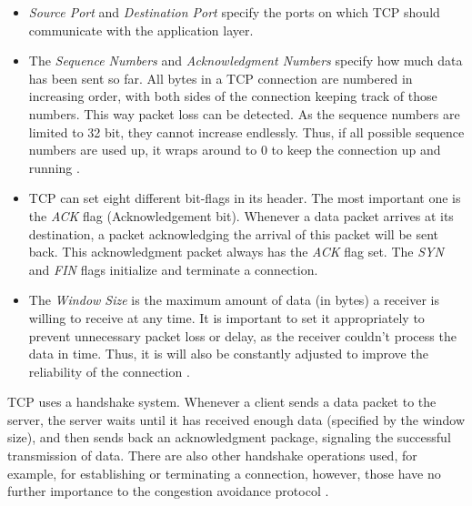 \documentclass[a4paper,conference]{IEEEtran}
\begin{document}
\begin{itemize}
\item \textit{Source Port} and \textit{Destination Port} specify the ports on which TCP should communicate with the application layer.

\item The \textit{Sequence Numbers} and \textit{Acknowledgment Numbers} specify how much data has been sent so far. All bytes in a TCP connection are numbered in increasing order, with both sides of the connection keeping track of those numbers. This way packet loss can be detected. As the sequence numbers are limited to 32 bit, they cannot increase endlessly. Thus, if all possible sequence numbers are used up, it wraps around to 0 to keep the connection up and running \cite{postel1981transmission}.

\item TCP can set eight different bit-flags in its header. The most important one is the \textit{ACK} flag (Acknowledgement bit). Whenever a data packet arrives at its destination, a packet acknowledging the arrival of this packet will be sent back. This acknowledgment packet always has the \textit{ACK} flag set. The \textit{SYN} and \textit{FIN} flags initialize and terminate a connection.

\item The \textit{Window Size} is the maximum amount of data (in bytes) a receiver is willing to receive at any time. It is important to set it appropriately to prevent unnecessary packet loss or delay, as the receiver couldn't process the data in time. Thus, it is will also be constantly adjusted to improve the reliability of the connection \cite{jacobson1992tcp}.
\end{itemize}
TCP uses a handshake system. Whenever a client sends a data packet to the server, the server waits until it has received enough data (specified by the window size), and then sends back an acknowledgment package, signaling the successful transmission of data. There are also other handshake operations used, for example, for establishing or terminating a connection, however, those have no further importance to the congestion avoidance protocol \cite{1209197,jacobson1992tcp,huston2000tcp,jacobson1995congestion}.
\end{document}
